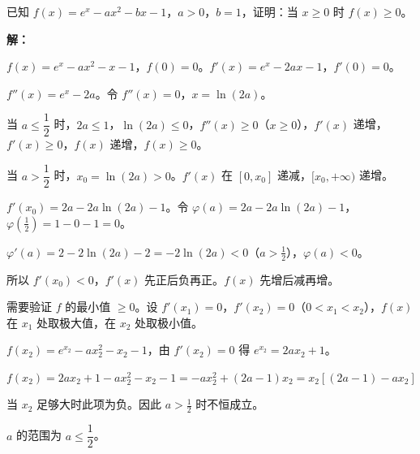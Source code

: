 \documentclass[12pt, a4paper]{ctexart}
\begin{document}
\begin{examplebox}
已知 $f(x)=e^x-ax^2-bx-1$，$a>0$，$b=1$，证明：当 $x\geq 0$ 时 $f(x)\geq 0$。

\textbf{解：}

$f(x)=e^x-ax^2-x-1$，$f(0)=0$。$f'(x)=e^x-2ax-1$，$f'(0)=0$。

$f''(x)=e^x-2a$。令 $f''(x)=0$，$x=\ln(2a)$。

当 $a\leq \dfrac{1}{2}$ 时，$2a\leq 1$，$\ln(2a)\leq 0$，$f''(x)\geq 0$（$x\geq 0$），$f'(x)$ 递增，$f'(x)\geq 0$，$f(x)$ 递增，$f(x)\geq 0$。

当 $a>\dfrac{1}{2}$ 时，$x_0=\ln(2a)>0$。$f'(x)$ 在 $[0,x_0]$ 递减，$[x_0,+\infty)$ 递增。

$f'(x_0)=2a-2a\ln(2a)-1$。令 $\varphi(a)=2a-2a\ln(2a)-1$，$\varphi(\frac{1}{2})=1-0-1=0$。

$\varphi'(a)=2-2\ln(2a)-2=-2\ln(2a)<0$（$a>\frac{1}{2}$），$\varphi(a)<0$。

所以 $f'(x_0)<0$，$f'(x)$ 先正后负再正。$f(x)$ 先增后减再增。

需要验证 $f$ 的最小值 $\geq 0$。设 $f'(x_1)=0$，$f'(x_2)=0$（$0<x_1<x_2$），$f(x)$ 在 $x_1$ 处取极大值，在 $x_2$ 处取极小值。

$f(x_2)=e^{x_2}-ax_2^2-x_2-1$，由 $f'(x_2)=0$ 得 $e^{x_2}=2ax_2+1$。

$f(x_2)=2ax_2+1-ax_2^2-x_2-1=-ax_2^2+(2a-1)x_2=x_2[(2a-1)-ax_2]$

当 $x_2$ 足够大时此项为负。因此 $a>\frac{1}{2}$ 时不恒成立。

$a$ 的范围为 $\boxed{a\leq \dfrac{1}{2}}$。
\end{examplebox}
\end{document}
